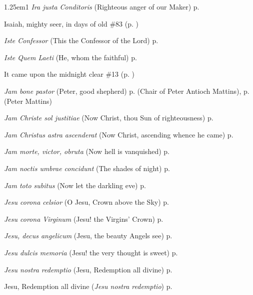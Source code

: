 \begin{hangparas}{1.25em}{1}
\textit{Ira justa Conditoris} (Righteous anger of our Maker) \dotfill p. \pageref{PreciousBloodInvitatory}
\par\noindent
Isaiah, mighty seer, in days of old \dotfill \#83 (p. \pageref{Hymn83})
\par\noindent
\textit{Iste Confessor} (This the Confessor of the Lord) \dotfill p. \pageref{ConfessorBishopEvensong}
\par\noindent
\textit{Iste Quem Laeti} (He, whom the faithful) \dotfill p. \pageref{JosephMattins}
\par\noindent
It came upon the midnight clear \dotfill \#13 (p. \pageref{Hymn13})
\par\noindent
\textit{Jam bone pastor} (Peter, good shepherd) \dotfill p. \pageref{PeterAntiochMattins} (Chair of Peter Antioch Mattins), p. \pageref{PeterMattins} (Peter Mattins)
\par\noindent
\textit{Jam Christe sol justitiae} (Now Christ, thou Sun of righteousness) \dotfill p. \pageref{FirstLentMattinsHymn}
\par\noindent
\textit{Jam Christus astra ascenderat} (Now Christ, ascending whence he came) \dotfill p. \pageref{WhitsundayInvitatoryHymn}
\par\noindent
\textit{Jam morte, victor, obruta} (Now hell is vanquished) \dotfill p. \pageref{HolyRosaryMattins}
\par\noindent
\textit{Jam noctis umbrae concidunt} (The shades of night) \dotfill p. \pageref{ScholasticaMattins}
\par\noindent
\textit{Jam toto subitus} (Now let the darkling eve) \dotfill p. \pageref{SevenSorrowsEvensong}
\par\noindent
\textit{Jesu corona celsior} (O Jesu, Crown above the Sky) \dotfill p. \pageref{ConfessorNotBishopMattins}
\par\noindent
\textit{Jesu corona Virginum} (Jesu! the Virgins' Crown) \dotfill p. \pageref{VirginMattins}
\par\noindent
\textit{Jesu, decus angelicum} (Jesu, the beauty Angels see) \dotfill p. \pageref{HolyNameMattinsHymn}
\par\noindent
\textit{Jesu dulcis memoria} (Jesu! the very thought is sweet) \dotfill p. \pageref{HolyNameEvensongHymn}
\par\noindent
\textit{Jesu nostra redemptio} (Jesu, Redemption all divine) \dotfill p. \pageref{AscensionMattinsHymn}
\par\noindent
Jesu, Redemption all divine (\textit{Jesu nostra redemptio}) \dotfill p. \pageref{AscensionMattinsHymn}

\end{hangparas}
